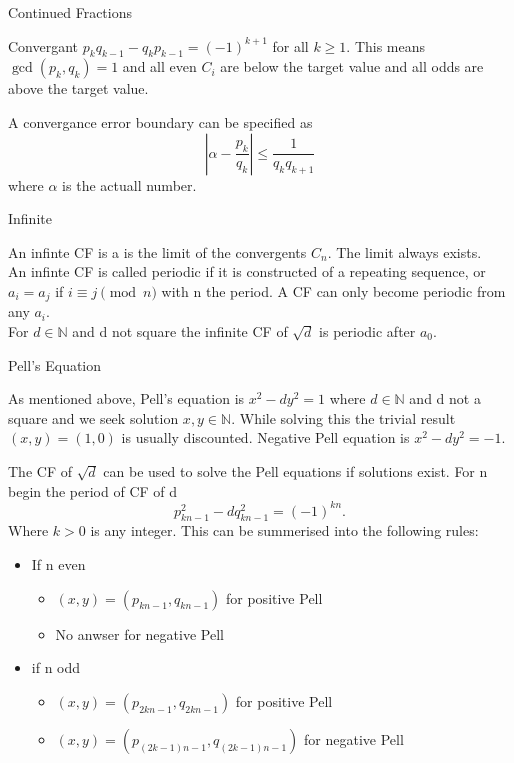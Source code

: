 \documentclass[12pt, letterpaper]{article}
\begin{document}
\begin{section}{Continued Fractions}
\begin{subsection}{Convergant}
    \(p_{k}q_{k - 1} - q_{k}p_{k - 1} = (-1)^{k + 1}\) for all \(k \geq 1\).
    This means \(\gcd(p_{k}, q_{k}) = 1\) and all even \(C_{i}\) are below the target
    value and all odds are above the target value.

    A convergance error boundary can be specified as
    \[|\alpha - \frac{p_{k}}{q_{k}}| \leq \frac{1}{q_{k}q_{k + 1}}\] where
    \(\alpha\) is the actuall number.

  \end{subsection}

  \begin{subsection}{Infinite}

    An infinte CF is a is the limit of the convergents \(C_{n}\). The limit
    always exists. \\
    An infinte CF is called periodic if it is constructed of a repeating
    sequence, or \(a_{i} = a_{j}\) if \(i \equiv j \pmod{n}\) with n the period.
    A CF can only become periodic from any \(a_{i}\). \\
    For \(d \in \mathbb{N}\) and d not square the infinite CF of \(\sqrt{d}\)
    is periodic after \(a_{0}\).

  \end{subsection}

  \newpage

  \begin{subsection}{Pell's Equation}

    As mentioned above, Pell's equation is \(x^{2} - dy^{2} = 1\) where
    \(d \in \mathbb{N}\) and d not a square and we seek solution \(x, y \in  \mathbb{N}\).
    While solving this the trivial result \((x, y) = (1, 0)\) is usually discounted.
    Negative Pell equation is \(x^{2} - dy^{2} = -1\).

    The CF of \(\sqrt{d}\) can be used to solve the Pell equations if solutions
    exist. For n begin the period of CF of d \[p^{2}_{kn - 1} - dq^{2}_{kn - 1} = (-1)^{kn}.\]
    Where \(k > 0\) is any integer.
    This can be summerised into the following rules:
    \begin{itemize}
      \item If n even
            \begin{itemize}
              \item \((x, y) = (p_{kn - 1}, q_{kn - 1})\) for positive Pell
              \item No anwser for negative Pell
            \end{itemize}
      \item if n odd
            \begin{itemize}
              \item \((x, y) = (p_{2kn - 1}, q_{2kn - 1})\) for positive Pell
              \item \((x, y) = (p_{(2k - 1)n - 1}, q_{(2k - 1)n - 1})\) for negative Pell
            \end{itemize}
    \end{itemize}


\end{subsection}
\end{section}
\end{document}
